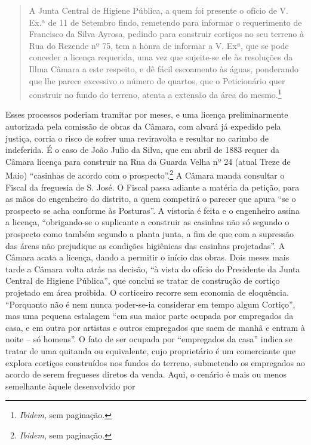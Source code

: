 \begin{quote}
A Junta Central de Higiene Pública, a quem foi presente o ofício de V.
Ex.ª de 11 de Setembro findo, remetendo para informar o requerimento de
Francisco da Silva Ayrosa, pedindo para construir cortiços no seu
terreno à Rua do Rezende nº 75, tem a honra de informar a V. Exª, que se
pode conceder a licença requerida, uma vez que sujeite-se ele às
resoluções da Illma Câmara a este respeito, e dê fácil escoamento às
águas, ponderando que lhe parece excessivo o número de quartos, que o
Peticionário quer construir no fundo do terreno, atenta a extensão da
área do mesmo.\footnote{\emph{Ibidem}, sem paginação.}
\end{quote}

Esses processos poderiam tramitar por meses, e uma licença
preliminarmente autorizada pela comissão de obras da Câmara, com alvará
já expedido pela justiça, corria o risco de sofrer uma reviravolta e
resultar no carimbo de indeferida. É o caso de João Julio da Silva, que
em abril de 1883 requer da Câmara licença para construir na Rua da
Guarda Velha nº 24 (atual Treze de Maio) ``casinhas de acordo com o
prospecto''.\footnote{\emph{Ibidem}, sem paginação.} A Câmara manda
consultar o Fiscal da freguesia de S. José. O Fiscal passa adiante a
matéria da petição, para as mãos do engenheiro do distrito, a quem
competirá o parecer que apura ``se o prospecto se acha conforme às
Posturas''. A vistoria é feita e o engenheiro assina a licença,
``obrigando-se o suplicante a construir as casinhas não só segundo o
prospecto como também segundo a planta junta, a fim de que com a
supressão das áreas não prejudique as condições higiênicas das casinhas
projetadas''. A Câmara acata a licença, dando a permitir o início das
obras. Dois meses mais tarde a Câmara volta atrás na decisão, ``à vista
do ofício do Presidente da Junta Central de Higiene Pública'', que
conclui se tratar de construção de cortiço projetado em área proibida. O
corticeiro recorre sem economia de eloquência. ``Porquanto não é nem
nunca poder-se-ia considerar em tempo algum Cortiço'', mas uma pequena
estalagem ``em sua maior parte ocupada por empregados da casa, e em
outra por artistas e outros empregados que saem de manhã e entram à
noite -- só homens''. O fato de ser ocupada por ``empregados da casa''
indica se tratar de uma quitanda ou equivalente, cujo proprietário é um
comerciante que explora cortiços construídos nos fundos do terreno,
submetendo os empregados ao acordo de serem fregueses diretos da venda.
Aqui, o cenário é mais ou menos semelhante àquele desenvolvido por
